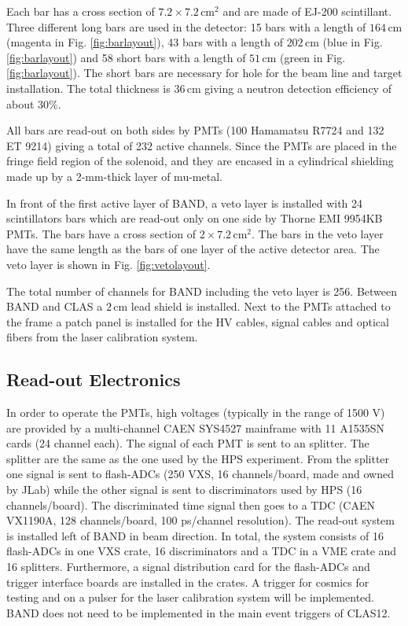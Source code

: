 \documentclass[review]{elsarticle}
\begin{document}
Each bar has a cross section of $7.2 \times 7.2\,\mathrm{cm}^{2}$ and are made of EJ-200 scintillant. Three different long bars are used in the detector: 15 bars with a length of $164\,\mathrm{cm}$ (magenta in Fig. \ref{fig:barlayout}), 43 bars with a length of $202\,\mathrm{cm}$ (blue in Fig. \ref{fig:barlayout}) and 58 short bars with a length of $51\,\mathrm{cm}$ (green in Fig. \ref{fig:barlayout}). The short bars are necessary for hole for the beam line and target installation. The total thickness is $36\,\mathrm{cm}$ giving a neutron detection efficiency of about 30\%.

All bars are read-out on both sides by PMTs (100 Hamamatsu R7724 and 132 ET 9214) giving a total of 232 active channels. Since the PMTs are placed in the fringe field region of the solenoid, and they are encased in a cylindrical shielding made up by a 2-mm-thick layer of mu-metal.

In front of the first active layer of BAND, a veto layer is installed with 24 scintillators bars which are read-out only on one side by Thorne EMI 9954KB PMTs. The bars have a cross section of $2 \times 7.2\,\mathrm{cm}^{2}$. The bars in the veto layer have the same length as the bars of one layer of the active detector area. The veto layer is shown in Fig. \ref{fig:vetolayout}.


The total number of channels for BAND including the veto layer is 256. Between BAND and CLAS a $2\,\mathrm{cm}$ lead shield is installed.
Next to the PMTs attached to the frame a patch panel is installed for the HV cables, signal cables and optical fibers from the laser calibration system.

\subsection{Read-out Electronics}


In order to operate the PMTs, high voltages (typically in the range of 1500 V) are provided by a multi-channel CAEN SYS4527 mainframe with 11 A1535SN cards (24 channel each).
The signal of each PMT is sent to an splitter. The splitter are the same as the one used by the HPS experiment.
From the splitter one signal is sent to flash-ADCs (250 VXS, 16 channels/board, made and owned by JLab) while the other signal is sent to  discriminators used by HPS (16 channels/board).
The discriminated time signal then goes to a TDC (CAEN VX1190A, 128 channels/board, 100 ps/channel resolution). The read-out system is installed left of BAND in beam direction. 
In total, the system consists of 16 flash-ADCs in one VXS crate, 16 discriminators and a TDC in a VME crate and 16 splitters.  Furthermore, a signal distribution card for the flash-ADCs and trigger interface boards are installed in the crates. A trigger for cosmics for testing and on a pulser for the laser calibration system will be implemented. BAND does not need to be implemented in the main event triggers of CLAS12.
\end{document}
